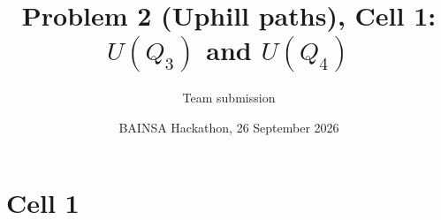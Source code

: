 
\title{Problem 2 (Uphill paths), Cell 1: $U(Q_3)$ and $U(Q_4)$}
\author{Team submission}
\date{BAINSA Hackathon, 26 September 2026}
\maketitle
\section{Cell 1}


